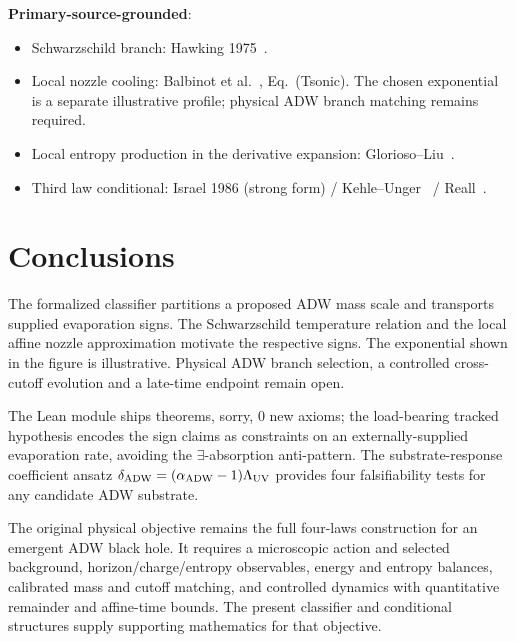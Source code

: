 \documentclass[prd,aps,twocolumn,floatfix,nofootinbib,superscriptaddress]{revtex4-2}
\newcommand{\aADW}{\alpha_{\rm ADW}}
\newcommand{\Ladw}{\Lambda_{\rm UV}}
\newcommand{\dADW}{\delta_{\rm ADW}}
\begin{document}
\textbf{Primary-source-grounded}:
\begin{itemize}
\item Schwarzschild branch: Hawking 1975~\cite{Hawking1975CMP}.
\item Local nozzle cooling: Balbinot et al.~\cite{Balbinot2005PRD},
  Eq.~(Tsonic). The chosen exponential is a separate illustrative
  profile; physical ADW branch matching remains required.
\item Local entropy production in the derivative expansion:
  Glorioso--Liu~\cite[Sec.~III.B]{GloriosoLiu2018}.
\item Third law conditional: Israel 1986 (strong form) /
  Kehle--Unger~\cite{KehleUnger2022ThirdLaw} /
  Reall~\cite{Reall2024ThirdLawBPS}.
\end{itemize}

\section{Conclusions}
\label{sec:conclusions}

The formalized classifier partitions a proposed ADW mass scale and
transports supplied evaporation signs. The Schwarzschild temperature
relation and the local affine nozzle approximation motivate the
respective signs. The exponential shown in the figure is illustrative.
Physical ADW branch selection, a controlled cross-cutoff evolution and
a late-time endpoint remain open.

The Lean module ships \bhThermoTotal{} theorems, \sorrycount{} sorry,
0 new axioms; the load-bearing tracked hypothesis encodes the
sign claims as constraints on an externally-supplied evaporation
rate, avoiding the $\exists$-absorption anti-pattern. The
substrate-response coefficient ansatz $\dADW = (\aADW - 1)\Ladw$
provides four falsifiability tests for any candidate ADW substrate.

The original physical objective remains the full four-laws
construction for an emergent ADW black hole. It requires a microscopic
action and selected background, horizon/charge/entropy observables,
energy and entropy balances, calibrated mass and cutoff matching,
and controlled dynamics with quantitative remainder and affine-time
bounds. The present classifier and conditional structures supply
supporting mathematics for that objective.

\end{document}
